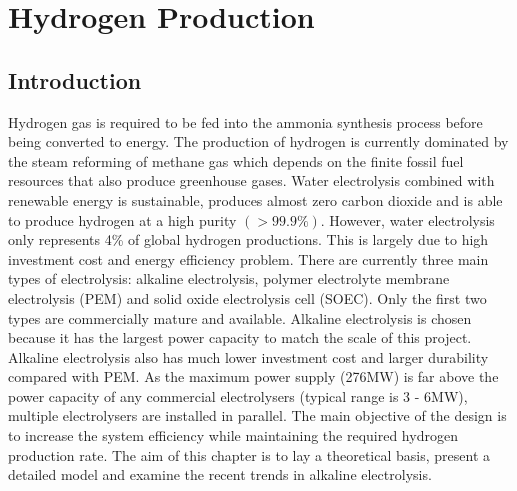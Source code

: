 


% 

\section{Hydrogen Production}
\subsection{Introduction} 


Hydrogen gas is required to be fed into the ammonia synthesis process before being converted to energy. The production of hydrogen is currently dominated by the steam reforming of methane gas which depends on the finite fossil fuel resources that also produce greenhouse gases. Water electrolysis combined with renewable energy is sustainable, produces almost zero carbon dioxide and is able to produce hydrogen at a high purity $(>99.9\%)$. However, water electrolysis only represents 4\% of global hydrogen productions.\cite{reversible} This is largely due to high investment cost and energy efficiency problem. There are currently three main types of electrolysis: alkaline electrolysis, polymer electrolyte membrane electrolysis (PEM) and solid oxide electrolysis cell (SOEC). Only the first two types are commercially mature and available. Alkaline electrolysis is chosen because it has the largest power capacity to match the scale of this project. Alkaline electrolysis also has much lower investment cost and larger durability compared with PEM. As the maximum power supply (276MW) is far above the power capacity of any commercial electrolysers (typical range is 3 - 6MW\cite{gibbs}), multiple electrolysers are installed in parallel.
The main objective of the design is to increase the system efficiency while maintaining the required hydrogen production rate. The aim of this chapter is to lay a theoretical basis, present a detailed model  and examine the recent trends in alkaline electrolysis. 


